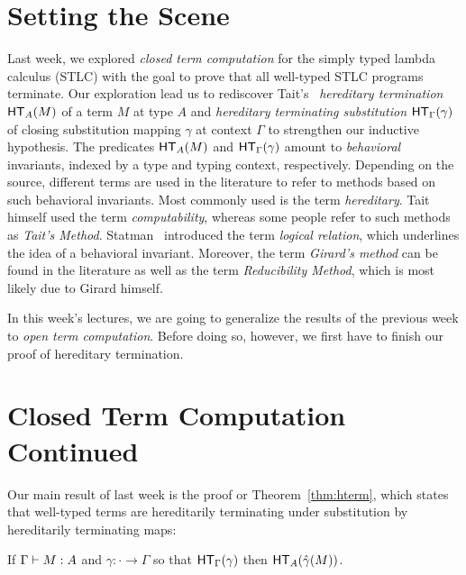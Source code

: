 \documentclass{article}
\begin{document}
\maketitle

\section{Setting the Scene}

Last week, we explored \emph{closed term computation} for the simply typed lambda calculus
(STLC) with the goal to prove that all well-typed STLC programs terminate.  Our exploration
lead us to rediscover Tait's~\citeyear{Tait:67} \emph{hereditary termination} $\mathsf{HT}_{A}(M)$ of
a term $M$ at type $A$ and \emph{hereditary terminating substitution} $\mathsf{HT}_{\Gamma}(\gamma)$
of closing substitution mapping $\gamma$ at context $\Gamma$ to strengthen our inductive
hypothesis.  The predicates $\mathsf{HT}_{A}(M)$ and $\mathsf{HT}_{\Gamma}(\gamma)$ amount to
\emph{behavioral} invariants, indexed by a type and typing context, respectively.  Depending on
the source, different terms are used in the literature to refer to methods based on such
behavioral invariants.  Most commonly used is the term \emph{hereditary}.  Tait himself used
the term \emph{computability}, whereas some people refer to such methods as \emph{Tait's
  Method}.  Statman~\citeyear{Statman:85} introduced the term \emph{logical relation}, which
underlines the idea of a behavioral invariant.  Moreover, the term \emph{Girard's method} can
be found in the literature as well as the term \emph{Reducibility Method}, which is most likely
due to Girard himself.

In this week's lectures, we are going to generalize the results of the previous week to
\emph{open term computation}.  Before doing so, however, we first have to finish our proof of
hereditary termination.

\section{Closed Term Computation Continued}

Our main result of last week is the proof or Theorem~\ref{thm:hterm}, which states that well-typed terms are hereditarily terminating under substitution by
hereditarily terminating maps:

\begin{theorem}\label{thm:hterm}
  If $\hasEF{\Gamma}{M}{A}$ and $\gamma : \cdot \to \Gamma$ so that
  $\mathsf{HT}_{\Gamma}(\gamma)$ then $\mathsf{HT}_{A}(\hat{\gamma}(M))$.
\end{theorem}
\end{document}
